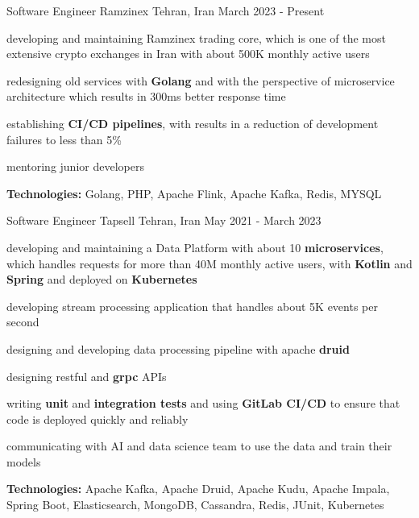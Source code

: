 

\begin{cventries}

  \cventry
    {Software Engineer} %
    {Ramzinex} %
    {Tehran, Iran} %
    {March 2023 - Present} %
    {
      \begin{cvitems} %
        \item developing and maintaining Ramzinex trading core, which is one of the most extensive crypto exchanges in Iran with about 500K monthly active users
        \item redesigning old services with \textbf{Golang} and with the perspective of microservice architecture which results in 300ms better response time
        \item establishing \textbf{CI/CD pipelines}, with results in a reduction of development failures to less than 5\%
        \item mentoring junior developers
        \item \textbf{Technologies:} Golang, PHP, Apache Flink, Apache Kafka, Redis, MYSQL
      \end{cvitems}
    }

    \cventry
    {Software Engineer} %
    {Tapsell} %
    {Tehran, Iran} %
    {May 2021 - March 2023} %
    {
      \begin{cvitems} %
        \item developing and maintaining a Data Platform with about 10 \textbf{microservices}, which handles requests for more than 40M monthly active users, with \textbf{Kotlin} and 
        \textbf{Spring} and deployed on \textbf{Kubernetes} 
        \item developing stream processing application that handles about 5K events per second
        \item designing and developing data processing pipeline with apache \textbf{druid}
        \item designing restful and \textbf{grpc} APIs
        \item writing \textbf{unit} and \textbf{integration tests} and using \textbf{GitLab CI/CD} to ensure that code is deployed quickly and reliably
        \item communicating with AI and data science team to use the data and train their models
        \item \textbf{Technologies:} Apache Kafka, Apache Druid, Apache Kudu, Apache Impala, Spring Boot, Elasticsearch, MongoDB, Cassandra, Redis, JUnit, Kubernetes
      \end{cvitems}
    }


\end{cventries}
